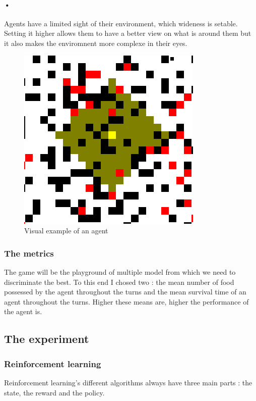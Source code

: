 \documentclass{article}
\begin{document}
\paragraph{•}
Agents have a limited sight of their environment, which wideness is setable. Setting it higher allows them to have a better view on what is around them but it also makes the enviromnent more complexe in their eyes.

\begin{figure}
\centering
\includegraphics[scale=0.2]{player_example.png}
\caption{Visual example of an agent}
\end{figure}

\subsubsection{The metrics}
The game will be the playground of multiple model from which we need to discriminate the best. To this end I chosed two : the mean number of food possessed by the agent throughout the turns and the mean survival time of an agent throughout the turns. Higher these means are, higher the performance of the agent is.

\subsection{The experiment}

\subsubsection{Reinforcement learning}

Reinforcement learning's different algorithms always have three main parts : the state, the reward and the policy.
\end{document}
